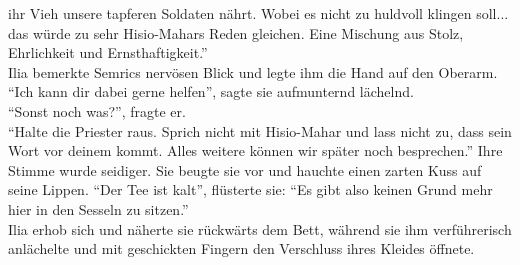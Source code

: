 ihr Vieh unsere tapferen Soldaten nährt. Wobei es nicht zu huldvoll klingen soll... das würde 
zu sehr Hisio-Mahars Reden gleichen. Eine Mischung aus Stolz, Ehrlichkeit und Ernsthaftigkeit.''\\
Ilia bemerkte Semrics nervösen Blick und legte ihm die Hand auf den Oberarm. ``Ich kann dir dabei 
gerne helfen'', sagte sie aufmunternd lächelnd.\\
``Sonst noch was?'', fragte er.\\
``Halte die Priester raus. Sprich nicht mit Hisio-Mahar und lass nicht zu, dass sein Wort vor 
deinem kommt. Alles weitere können wir später noch besprechen.'' Ihre Stimme wurde seidiger. Sie 
beugte sie vor und hauchte einen zarten Kuss auf seine Lippen. ``Der Tee ist kalt'', flüsterte sie: 
``Es gibt also keinen Grund mehr hier in den Sesseln zu sitzen.''\\
Ilia erhob sich und näherte sie rückwärts dem Bett, während sie ihm verführerisch anlächelte und 
mit geschickten Fingern den Verschluss ihres Kleides öffnete.\\

